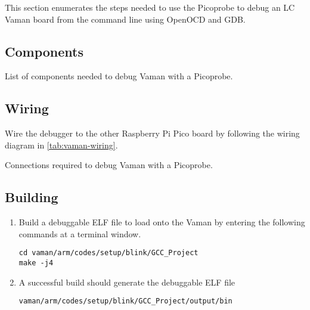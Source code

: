 This section enumerates the steps needed to use the Picoprobe to debug an LC
Vaman board from  the command line using OpenOCD and GDB.

\subsection{Components}
\begin{table}[!ht]
    
    \caption{List of components needed to debug Vaman with a Picoprobe.}
    \label{tab:vaman-comp}
\end{table}

\subsection{Wiring}
Wire the debugger to the other Raspberry Pi Pico board by following the
wiring diagram in \autoref{tab:vaman-wiring}.
\begin{table}[!ht]
    
    \caption{Connections required to debug Vaman with a Picoprobe.}
    \label{tab:vaman-wiring}
\end{table}

\subsection{Building}
\begin{enumerate}
    \item Build a debuggable ELF file to load onto the Vaman by entering the
    following commands at a terminal window.
    \begin{lstlisting}
cd vaman/arm/codes/setup/blink/GCC_Project
make -j4
    \end{lstlisting}
    \item A successful build should generate the debuggable ELF file
    \begin{lstlisting}
vaman/arm/codes/setup/blink/GCC_Project/output/bin
    \end{lstlisting}
\end{enumerate}


